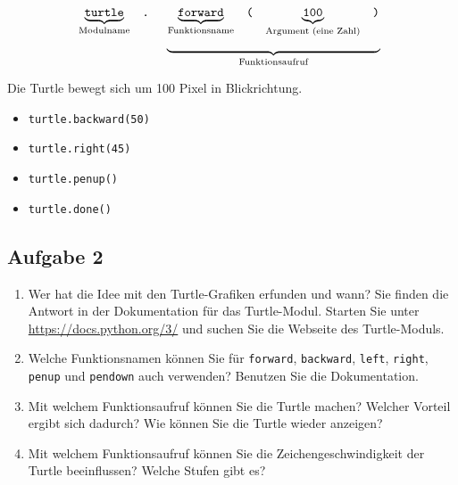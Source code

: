 $$
\begin{array}[t]{ccc} 
\underbrace{\textrm{\texttt{turtle}}}_{\textrm{Modulname}} & \texttt{.} & 
\begin{array}[t]{cccc} 
\underbrace{\textrm{\texttt{forward}}}_{\textrm{Funktionsname}} & \texttt{(} &\underbrace{\textrm{\texttt{100}}}_{\textrm{Argument (eine Zahl)}} & \texttt{)} \end{array} \\
 &  & \underbrace{\hspace{6cm}}_{\textrm{Funktionsaufruf}}
\end{array}
$$
\begin{center}
Die Turtle bewegt sich um \num{100} Pixel in Blickrichtung.
\end{center}
\vspace{0.5cm}
\begin{itemize}
	\centering
	\item[] \lstinline{turtle.backward(50)}
	\vspace{2.25cm}
	\item[] \lstinline{turtle.right(45)}
	\vspace{2.25cm}
	\item[] \lstinline{turtle.penup()}
	\vspace{2.25cm}
	\item[] \lstinline{turtle.done()}
	\vspace{2.25cm}
\end{itemize}

\subsection{Aufgabe 2}

\begin{enumerate}
	\item Wer hat die Idee mit den Turtle-Grafiken erfunden und wann? Sie finden die Antwort in der Dokumentation für das Turtle-Modul. Starten Sie unter \url{https://docs.python.org/3/} und suchen Sie die Webseite des Turtle-Moduls.
	\fillwithlines{0.5in}
	\item Welche Funktionsnamen können Sie für \lstinline{forward}, \lstinline{backward}, \lstinline{left}, \lstinline{right}, \lstinline{penup} und \lstinline{pendown} auch verwenden? Benutzen Sie die Dokumentation.
	\fillwithlines{0.5in}
	\item Mit welchem Funktionsaufruf können Sie die Turtle  machen? Welcher Vorteil ergibt sich dadurch? Wie können Sie die Turtle wieder anzeigen?
	\fillwithlines{1in}
	\item Mit welchem Funktionsaufruf können Sie die Zeichengeschwindigkeit der Turtle beeinflussen? Welche Stufen gibt es?
	\fillwithlines{1in}
\end{enumerate}

